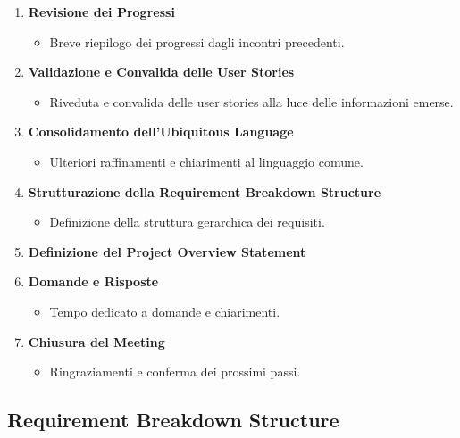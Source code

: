 \begin{enumerate}
    \item \textbf{Revisione dei Progressi}
          \begin{itemize}
              \item Breve riepilogo dei progressi dagli incontri precedenti.
          \end{itemize}

    \item \textbf{Validazione e Convalida delle User Stories}
          \begin{itemize}
              \item Riveduta e convalida delle user stories alla luce delle informazioni emerse.
          \end{itemize}

    \item \textbf{Consolidamento dell'Ubiquitous Language}
          \begin{itemize}
              \item Ulteriori raffinamenti e chiarimenti al linguaggio comune.
          \end{itemize}

    \item \textbf{Strutturazione della Requirement Breakdown Structure}
          \begin{itemize}
              \item Definizione della struttura gerarchica dei requisiti.
          \end{itemize}

    \item \textbf{Definizione del Project Overview Statement}

    \item \textbf{Domande e Risposte}
          \begin{itemize}
              \item Tempo dedicato a domande e chiarimenti.
          \end{itemize}

    \item \textbf{Chiusura del Meeting}
          \begin{itemize}
              \item Ringraziamenti e conferma dei prossimi passi.
          \end{itemize}
\end{enumerate}

\subsection{Requirement Breakdown Structure}

